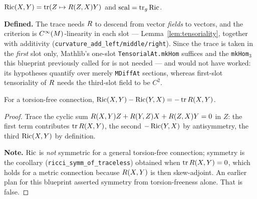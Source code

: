 \begin{definition}
  \label{def:ricci}
  $\operatorname{Ric}(X,Y) = \operatorname{tr}(Z \mapsto R(Z,X)Y)$ and
  $\operatorname{scal} = \operatorname{tr}_g \operatorname{Ric}$.

  \leanok
  \textbf{Defined.} The trace needs $R$ to descend from vector \emph{fields}
  to vectors, and the criterion is $C^\infty(M)$-linearity in each slot ---
  Lemma~\ref{lem:tensoriality}, together with additivity
  (\texttt{curvature\_add\_left/middle/right}). Since the trace is taken in the
  \emph{first} slot only, Mathlib's one-slot \texttt{TensorialAt.mkHom}
  suffices and the \texttt{mkHom}$_3$ this blueprint previously called for is
  not needed --- and would not have worked: its hypotheses quantify over merely
  \texttt{MDiffAt} sections, whereas first-slot tensoriality of $R$ needs
  the third-slot field to be $C^2$.
\end{definition}

\begin{lemma}
  \label{lem:trace-bianchi}
  \leanok
  For a torsion-free connection,
  $\operatorname{Ric}(X,Y) - \operatorname{Ric}(Y,X) = -\operatorname{tr} R(X,Y)$.
\end{lemma}

\begin{proof}
  \leanok
  Trace the cyclic sum $R(X,Y)Z + R(Y,Z)X + R(Z,X)Y = 0$ in $Z$:
  the first term contributes $\operatorname{tr}R(X,Y)$, the second
  $-\operatorname{Ric}(Y,X)$ by antisymmetry, the third $\operatorname{Ric}(X,Y)$ by definition.

  \textbf{Note.} $\operatorname{Ric}$ is \emph{not} symmetric for a general torsion-free
  connection; symmetry is the corollary
  (\texttt{ricci\_symm\_of\_traceless}) obtained when
  $\operatorname{tr}R(X,Y) = 0$, which holds for a metric connection
  because $R(X,Y)$ is then skew-adjoint. An earlier plan for this blueprint
  asserted symmetry from torsion-freeness alone. That is false.
\end{proof}

